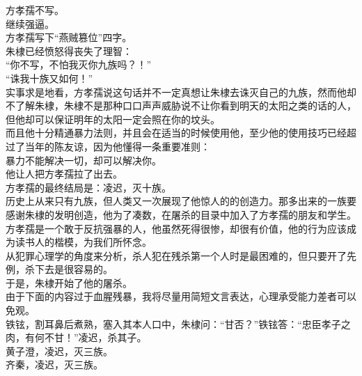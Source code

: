 \begin{multicols}{\theparacolNo}
方孝孺不写。\\

继续强逼。\\

方孝孺写下“燕贼篡位”四字。\\

朱棣已经愤怒得丧失了理智：\\

“你不写，不怕我灭你九族吗？！”\\

“诛我十族又如何！”\\

实事求是地看，方孝孺说这句话并不一定真想让朱棣去诛灭自己的九族，然而他却不了解朱棣，朱棣不是那种口口声声威胁说不让你看到明天的太阳之类的话的人，但他却可以保证明年的太阳一定会照在你的坟头。\\

而且他十分精通暴力法则，并且会在适当的时候使用他，至少他的使用技巧已经超过了当年的陈友谅，因为他懂得一条重要准则：\\

暴力不能解决一切，却可以解决你。\\

他让人把方孝孺拉了出去。\\

方孝孺的最终结局是：凌迟，灭十族。\\

历史上从来只有九族，但人类又一次展现了他惊人的的创造力。那多出来的一族要感谢朱棣的发明创造，他为了凑数，在屠杀的目录中加入了方孝孺的朋友和学生。\\

方孝孺是一个敢于反抗强暴的人，他虽然死得很惨，却很有价值，他的行为应该成为读书人的楷模，为我们所怀念。\\

从犯罪心理学的角度来分析，杀人犯在残杀第一个人时是最困难的，但只要开了先例，杀下去是很容易的。\\

于是，朱棣开始了他的屠杀。\\

由于下面的内容过于血腥残暴，我将尽量用简短文言表达，心理承受能力差者可以免观。\\

铁铉，割耳鼻后煮熟，塞入其本人口中，朱棣问：“甘否？”铁铉答：“忠臣孝子之肉，有何不甘！”凌迟，杀其子。\\

黄子澄，凌迟，灭三族。\\

齐秦，凌迟，灭三族。\\


\end{multicols}
